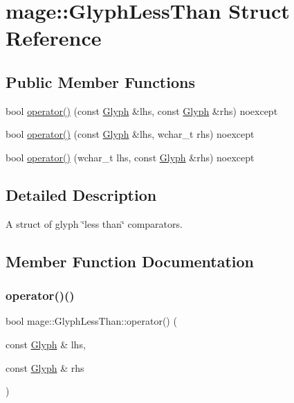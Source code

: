\hypertarget{structmage_1_1_glyph_less_than}{}\section{mage\+:\+:Glyph\+Less\+Than Struct Reference}
\label{structmage_1_1_glyph_less_than}
\subsection*{Public Member Functions}
\begin{DoxyCompactItemize}
\item 
bool \hyperlink{structmage_1_1_glyph_less_than_a7a8b5bb8d25f49790105ffee80cf2f71}{operator()} (const \hyperlink{structmage_1_1_glyph}{Glyph} \&lhs, const \hyperlink{structmage_1_1_glyph}{Glyph} \&rhs) noexcept
\item 
bool \hyperlink{structmage_1_1_glyph_less_than_a0ae04e2104bafaa37e951409a126a44f}{operator()} (const \hyperlink{structmage_1_1_glyph}{Glyph} \&lhs, wchar\+\_\+t rhs) noexcept
\item 
bool \hyperlink{structmage_1_1_glyph_less_than_a24f8a3b7cf190212a226fcf4900f558a}{operator()} (wchar\+\_\+t lhs, const \hyperlink{structmage_1_1_glyph}{Glyph} \&rhs) noexcept
\end{DoxyCompactItemize}


\subsection{Detailed Description}
A struct of glyph \char`\"{}less than\char`\"{} comparators. 

\subsection{Member Function Documentation}
\hypertarget{structmage_1_1_glyph_less_than_a7a8b5bb8d25f49790105ffee80cf2f71}{}\label{structmage_1_1_glyph_less_than_a7a8b5bb8d25f49790105ffee80cf2f71} 
\subsubsection{\texorpdfstring{operator()()}{operator()()}\hspace{0.1cm}{\footnotesize\ttfamily [1/3]}}
{\footnotesize\ttfamily bool mage\+::\+Glyph\+Less\+Than\+::operator() (\begin{DoxyParamCaption}\item[{const \hyperlink{structmage_1_1_glyph}{Glyph} \&}]{lhs,  }\item[{const \hyperlink{structmage_1_1_glyph}{Glyph} \&}]{rhs }\end{DoxyParamCaption})\hspace{0.3cm}{\ttfamily [noexcept]}}

